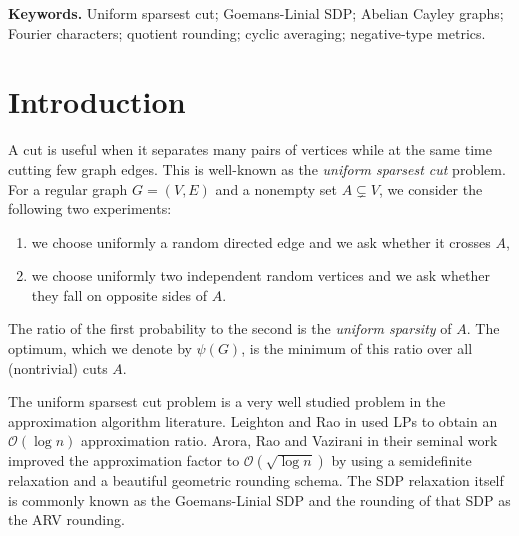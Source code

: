 \documentclass[11pt]{article}
\theoremstyle{definition}
\theoremstyle{remark}
\begin{document}
\medskip
\noindent\textbf{Keywords.} Uniform sparsest cut; Goemans-Linial SDP; Abelian Cayley graphs; Fourier characters; quotient rounding; cyclic averaging; negative-type metrics.

\section{Introduction}\label{sec:introduction}


A cut is useful when it separates many pairs of vertices while at the same time  cutting few graph edges. This is well-known as the  \emph{uniform sparsest cut} problem. For a regular graph $G=(V,E)$ and a nonempty set $A\subsetneq V$, we consider the following two experiments:
\begin{enumerate}
  \item we choose uniformly a random directed edge and we ask whether it crosses $A$,
  \item we choose uniformly two independent random vertices and we ask whether they fall on opposite sides of $A$.
\end{enumerate}
The ratio of the first probability to the second is the \emph{uniform sparsity} of $A$. The optimum, which we denote by $\psi(G)$, is the minimum of this ratio over all (nontrivial) cuts $A$.

The uniform sparsest cut problem is a very well studied problem in the approximation algorithm literature. Leighton and Rao in  \cite{LR99} used LPs to obtain an $\mathcal{O}(\log n)$ approximation ratio. Arora, Rao and Vazirani in their seminal work \cite{ARV09} improved the approximation factor to $\mathcal{O}(\sqrt{\log n})$ by using a semidefinite relaxation and a beautiful geometric rounding schema. The SDP relaxation itself is commonly known as the Goemans-Linial SDP and the rounding of that SDP as the ARV rounding.  
\end{document}
